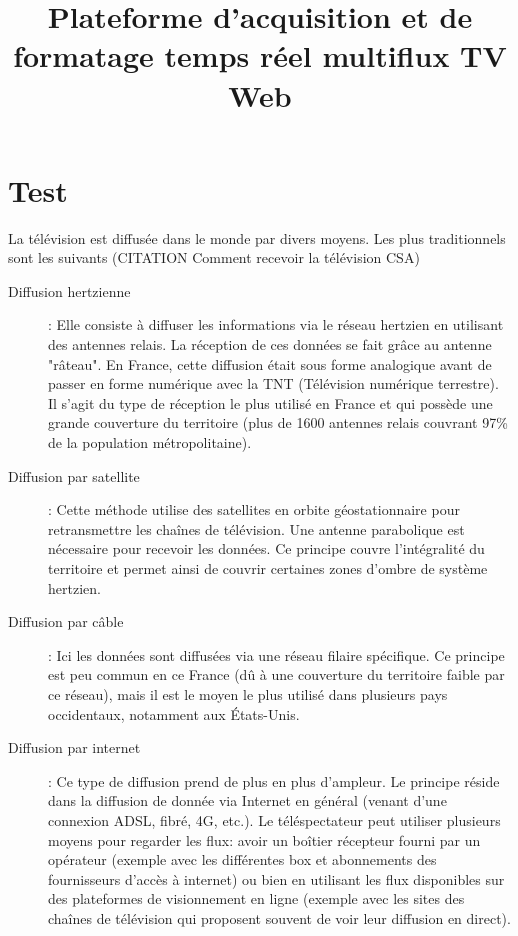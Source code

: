 \documentclass{polytech/polytech}
\title{Plateforme d'acquisition et de formatage temps réel multiflux TV Web}
\begin{document}
\part{Test}


La télévision est diffusée dans le monde par divers moyens. Les plus traditionnels sont les suivants (CITATION Comment recevoir la télévision CSA)

\begin{description}
	\item[Diffusion hertzienne]: Elle consiste à diffuser les informations via le réseau hertzien en utilisant des antennes relais. La réception de ces données se fait grâce au antenne "râteau". En France, cette diffusion était sous forme analogique avant de passer en forme numérique avec la TNT (Télévision numérique terrestre). Il s'agit du type de réception le plus utilisé en France et qui possède une grande couverture du territoire (plus de 1600 antennes relais couvrant 97\% de la population métropolitaine).
	
	\item[Diffusion par satellite]: Cette méthode utilise des satellites en orbite géostationnaire pour retransmettre les chaînes de télévision. Une antenne parabolique est nécessaire pour recevoir les données. Ce principe couvre l'intégralité du territoire et permet ainsi de couvrir certaines zones d'ombre de système hertzien.

	\item[Diffusion par câble]: Ici les données sont diffusées via une réseau filaire spécifique. Ce principe est peu commun en ce France (dû à une couverture du territoire faible par ce réseau), mais il est le moyen le plus utilisé dans plusieurs pays occidentaux, notamment aux \'{E}tats-Unis.
	
	\item[Diffusion par internet]: Ce type de diffusion prend de plus en plus d'ampleur. Le principe réside dans la diffusion de donnée via Internet en général (venant d'une connexion ADSL, fibré, 4G, etc.). Le téléspectateur peut utiliser plusieurs moyens pour regarder les flux: avoir un boîtier récepteur fourni par un opérateur (exemple avec les différentes box et abonnements des fournisseurs d'accès à internet) ou bien en utilisant les flux disponibles sur des plateformes de visionnement en ligne (exemple avec les sites des chaînes de télévision qui proposent souvent de voir leur diffusion en direct).
	
\end{description}
\end{document}
